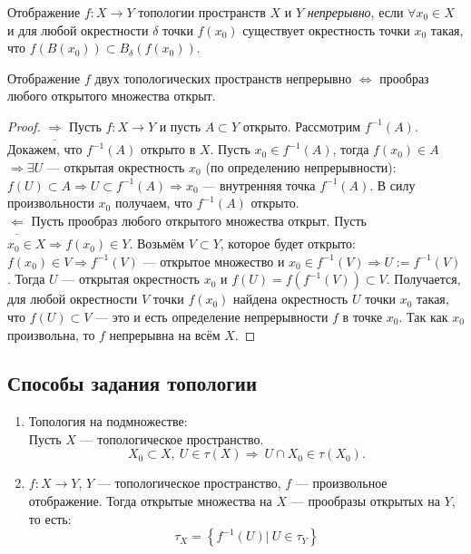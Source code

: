 \begin{definition}
    Отображение $f: X \to Y$ топологии пространств $X$ и $Y$ \textit{непрерывно}, если $\forall x_0 \in X$ и для любой окрестности $\delta$ точки $f(x_0)$ существует окрестность точки $x_0$ такая, что $f(B(x_0)) \subset B_{\delta} (f(x_0))$.
\end{definition}

\begin{statement}
    Отображение $f$ двух топологических пространств непрерывно $\Longleftrightarrow$ прообраз любого открытого множества открыт.
\end{statement}
\begin{proof}
    $\underline{\Longrightarrow}$ Пусть $f: X \to Y$ и пусть $A \subset Y$ открыто. Рассмотрим $f^{-1}(A)$. Докажем, что $f^{-1}(A)$ открыто в $X$. Пусть $x_0 \in f^{-1}(A)$, тогда $f(x_0) \in A$ $\Longrightarrow \exists U$ — открытая окрестность $x_0$ (по определению непрерывности): $f(U) \subset A \Longrightarrow U \subset f^{-1}(A) \Longrightarrow x_0$ — внутренняя точка $f^{-1}(A)$. В силу произвольности $x_0$ получаем, что $f^{-1}(A)$ открыто. \\
    $\underline{\Longleftarrow}$ Пусть прообраз любого открытого множества открыт. Пусть $x_0 \in X \Longrightarrow f(x_0) \in Y$. Возьмём $V \subset Y$, которое будет открыто: $f(x_0) \in V \Longrightarrow f^{-1}(V)$ — открытое множество и $x_0 \in f^{-1}(V) \Longrightarrow U := f^{-1}(V)$. Тогда $U$  — открытая окрестность $x_0$ и $f(U) = f(f^{-1}(V)) \subset V$. Получается, для любой окрестности $V$ точки $f(x_0)$ найдена окрестность $U$ точки $x_0$ такая, что $f(U) \subset V$ — это и есть определение непрерывности $f$ в точке $x_0$. Так как $x_0$ произвольна, то $f$ непрерывна на всём $X$.
\end{proof}

\subsection{Способы задания топологии}
\begin{enumerate}
    \item Топология на подмножестве: \\
    Пусть $X$ — топологическое пространство. $$X_0 \subset X, \ U \in \tau(X) \Longrightarrow \ U \cap X_0 \in \tau(X_0).$$
    \item $f: X \to Y$, $Y$ — топологическое пространство, $f$ — произвольное отображение. Тогда открытые множества на $X$ — прообразы открытых на $Y$, то есть:
    \[\tau_X = \left\{f^{-1}(U) | \ U \in \tau_Y\right\}\]
\end{enumerate}

